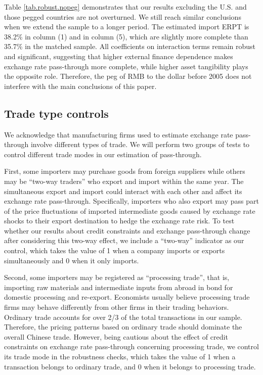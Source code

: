 \documentclass[12pt]{article}
\begin{document}
Table \ref{tab.robust.nopeg} demonstrates that our results excluding the U.S. and those pegged countries are not overturned. We still reach similar conclusions when we extend the sample to a longer period. The estimated import ERPT is 38.2\% in column (1) and in column (5), which are slightly more complete than 35.7\% in the matched sample. All coefficients on interaction terms remain robust and significant, suggesting that higher external finance dependence makes exchange rate pass-through more complete, while higher asset tangibility plays the opposite role. Therefore, the peg of RMB to the dollar before 2005 does not interfere with the main conclusions of this paper.

\subsection{Trade type controls}

We acknowledge that manufacturing firms used to estimate exchange rate pass-through involve different types of trade. We will perform two groups of tests to control different trade modes in our estimation of pass-through.

First, some importers may purchase goods from foreign suppliers while others may be ``two-way traders'' who export and import within the same year. The simultaneous export and import could interact with each other and affect its exchange rate pass-through. Specifically, importers who also export may pass part of the price fluctuations of imported intermediate goods caused by exchange rate shocks to their export destination to hedge the exchange rate risk. To test whether our results about credit constraints and exchange pass-through change after considering this two-way effect, we include a ``two-way'' indicator as our control, which takes the value of 1 when a company imports or exports simultaneously and 0 when it only imports.

Second, some importers may be registered as ``processing trade'', that is, importing raw materials and intermediate inputs from abroad in bond for domestic processing and re-export. Economists usually believe processing trade firms may behave differently from other firms in their trading behaviors. Ordinary trade accounts for over 2/3 of the total transactions in our sample. Therefore, the pricing patterns based on ordinary trade should dominate the overall Chinese trade. However, being cautious about the effect of credit constraints on exchange rate pass-through concerning processing trade, we control its trade mode in the robustness checks, which takes the value of 1 when a transaction belongs to ordinary trade, and 0 when it belongs to processing trade.
\end{document}
